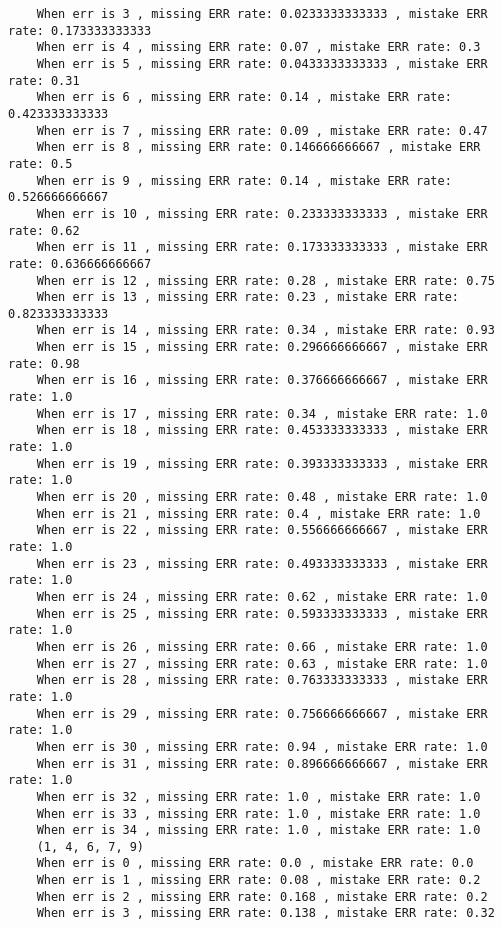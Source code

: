 \documentclass{article}
\begin{document}
\begin{verbatim}
    When err is 3 , missing ERR rate: 0.0233333333333 , mistake ERR rate: 0.173333333333
    When err is 4 , missing ERR rate: 0.07 , mistake ERR rate: 0.3
    When err is 5 , missing ERR rate: 0.0433333333333 , mistake ERR rate: 0.31
    When err is 6 , missing ERR rate: 0.14 , mistake ERR rate: 0.423333333333
    When err is 7 , missing ERR rate: 0.09 , mistake ERR rate: 0.47
    When err is 8 , missing ERR rate: 0.146666666667 , mistake ERR rate: 0.5
    When err is 9 , missing ERR rate: 0.14 , mistake ERR rate: 0.526666666667
    When err is 10 , missing ERR rate: 0.233333333333 , mistake ERR rate: 0.62
    When err is 11 , missing ERR rate: 0.173333333333 , mistake ERR rate: 0.636666666667
    When err is 12 , missing ERR rate: 0.28 , mistake ERR rate: 0.75
    When err is 13 , missing ERR rate: 0.23 , mistake ERR rate: 0.823333333333
    When err is 14 , missing ERR rate: 0.34 , mistake ERR rate: 0.93
    When err is 15 , missing ERR rate: 0.296666666667 , mistake ERR rate: 0.98
    When err is 16 , missing ERR rate: 0.376666666667 , mistake ERR rate: 1.0
    When err is 17 , missing ERR rate: 0.34 , mistake ERR rate: 1.0
    When err is 18 , missing ERR rate: 0.453333333333 , mistake ERR rate: 1.0
    When err is 19 , missing ERR rate: 0.393333333333 , mistake ERR rate: 1.0
    When err is 20 , missing ERR rate: 0.48 , mistake ERR rate: 1.0
    When err is 21 , missing ERR rate: 0.4 , mistake ERR rate: 1.0
    When err is 22 , missing ERR rate: 0.556666666667 , mistake ERR rate: 1.0
    When err is 23 , missing ERR rate: 0.493333333333 , mistake ERR rate: 1.0
    When err is 24 , missing ERR rate: 0.62 , mistake ERR rate: 1.0
    When err is 25 , missing ERR rate: 0.593333333333 , mistake ERR rate: 1.0
    When err is 26 , missing ERR rate: 0.66 , mistake ERR rate: 1.0
    When err is 27 , missing ERR rate: 0.63 , mistake ERR rate: 1.0
    When err is 28 , missing ERR rate: 0.763333333333 , mistake ERR rate: 1.0
    When err is 29 , missing ERR rate: 0.756666666667 , mistake ERR rate: 1.0
    When err is 30 , missing ERR rate: 0.94 , mistake ERR rate: 1.0
    When err is 31 , missing ERR rate: 0.896666666667 , mistake ERR rate: 1.0
    When err is 32 , missing ERR rate: 1.0 , mistake ERR rate: 1.0
    When err is 33 , missing ERR rate: 1.0 , mistake ERR rate: 1.0
    When err is 34 , missing ERR rate: 1.0 , mistake ERR rate: 1.0
    (1, 4, 6, 7, 9)
    When err is 0 , missing ERR rate: 0.0 , mistake ERR rate: 0.0
    When err is 1 , missing ERR rate: 0.08 , mistake ERR rate: 0.2
    When err is 2 , missing ERR rate: 0.168 , mistake ERR rate: 0.2
    When err is 3 , missing ERR rate: 0.138 , mistake ERR rate: 0.32

\end{verbatim}
\end{document}
